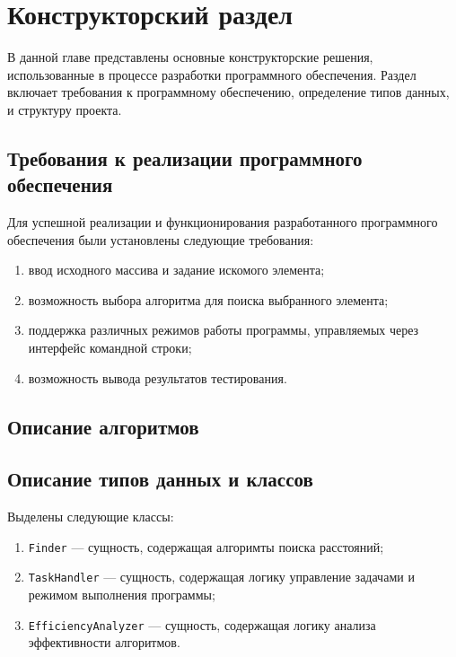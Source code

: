 \chapter{Конструкторский раздел}
В данной главе представлены основные конструкторские решения, использованные в процессе разработки программного обеспечения. Раздел включает требования к программному обеспечению, определение типов данных, и структуру проекта.

\section{Требования к реализации программного обеспечения}
Для успешной реализации и функционирования разработанного программного обеспечения были установлены следующие требования:
\begin{enumerate}[label=\arabic*)]
	\item ввод исходного массива и задание искомого элемента;
	\item возможность выбора алгоритма для поиска выбранного элемента;
	\item поддержка различных режимов работы программы, управляемых через интерфейс командной строки;
	\item возможность вывода результатов тестирования.
\end{enumerate}

\section{Описание алгоритмов}

\clearpage


\section{Описание типов данных и классов}
Выделены следующие классы:
\begin{enumerate}[label=\arabic*)]
	\item \texttt{Finder} --- сущность, содержащая алгоримты поиска расстояний;
	\item \texttt{TaskHandler} ---  сущность, содержащая логику управление задачами и режимом выполнения программы;
	\item \texttt{EfficiencyAnalyzer} --- сущность, содержащая логику анализа эффективности алгоритмов.
\end{enumerate}


